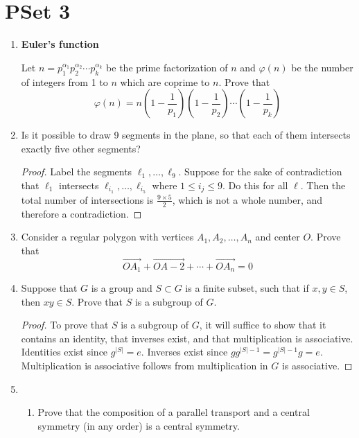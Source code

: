\documentclass[../main.tex]{subfiles}
\begin{document}
\section{PSet 3}
\begin{enumerate}
    \item {}\textbf{Euler's function}\par
    Let $n=p_1^{\alpha_1}p_2^{\alpha_2}\cdots p_k^{\alpha_k}$ be the prime factorization of $n$ and $\varphi(n)$ be the number of integers from 1 to $n$ which are coprime to $n$. Prove that
    \begin{equation*}
        \varphi(n) = n\left( 1-\frac{1}{p_1} \right)\left( 1-\frac{1}{p_2} \right)\cdots\left( 1-\frac{1}{p_k} \right)
    \end{equation*}
    \item Is it possible to draw 9 segments in the plane, so that each of them intersects exactly five other segments?
    \begin{proof}
        Label the segments $\ell_1,\dots,\ell_9$. Suppose for the sake of contradiction that $\ell_1$ intersects $\ell_{i_1},\dots,\ell_{i_5}$ where $1\leq i_j\leq 9$. Do this for all $\ell$. Then the total number of intersections is $\frac{9\times 5}{2}$, which is not a whole number, and therefore a contradiction.
    \end{proof}
    \item Consider a regular polygon with vertices $A_1,A_2,\dots,A_n$ and center $O$. Prove that
    \begin{equation*}
        \overrightarrow{OA_1}+\overrightarrow{OA-2}+\cdots+\overrightarrow{OA_n} = 0
    \end{equation*}
    \item Suppose that $G$ is a group and $S\subset G$ is a finite subset, such that if $x,y\in S$, then $xy\in S$. Prove that $S$ is a subgroup of $G$.
    \begin{proof}
        To prove that $S$ is a subgroup of $G$, it will suffice to show that it contains an identity, that inverses exist, and that multiplication is associative. Identities exist since $g^{|S|}=e$. Inverses exist since $gg^{|S|-1}=g^{|S|-1}g=e$. Multiplication is associative follows from multiplication in $G$ is associative.
    \end{proof}
    \item 
    \begin{enumerate}
        \item Prove that the composition of a parallel transport and a central symmetry (in any order) is a central symmetry.

\end{enumerate}
\end{enumerate}
\end{document}
